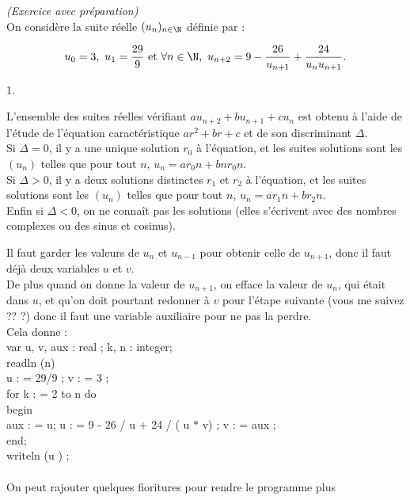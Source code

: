 \documentclass[11pt]{article}%
\begin{document}
 \begin{exercice}{\it (Exercice avec préparation)}~\\
 On considère la suite réelle $(u_{n})_{n \in \N}$ définie par : 
 
\[
 u_{0} = 3,\ u_{1} = \frac{29}{9} \text{ et } \forall n \in \N,\ u_{n +
2} = 9 - \frac{26}{u_{n + 1}} + \frac{24}{u_{n} u_{n + 1}}.
 
\]
 \begin{noliste}{1.}
 \setlength{\itemsep}{4mm}
 \item L'ensemble des suites réelles vérifiant $a u_{n + 2} + b u_{n +
1} + c u_{n}$ est obtenu à l'aide de l'étude de l'équation
caractéristique $a r^{2} + b r + c$ et de son discriminant $\Delta$. \\
 Si $\Delta = 0$, il y a une unique solution $r_{0}$ à l'équation, et
les suites solutions sont les $(u_{n})$ telles que pour tout $n$,
$u_{n} = a r_{0}{n} + b n r_{0}{n}$. \\
 Si $\Delta > 0$, il y a deux solutions distinctes $r_{1}$ et $r_{2}$ à
l'équation, et les suites solutions sont les $(u_{n})$ telles que pour
tout $n$, $u_{n} = a r_{1}{n} + b r_{2}{n}$. \\
 Enfin si $\Delta < 0$, on ne connaît pas les solutions (elles
s'écrivent avec des nombres complexes ou des sinus et cosinus). \\
 \item Il faut garder les valeurs de $u_{n}$ et $u_{n-1}$ pour obtenir
celle de $u_{n + 1}$, donc il faut déjà deux variables $u$ et $v$. \\
 De plus quand on donne la valeur de $u_{n + 1}$, on efface la valeur
de $u_{n}$, qui était dans $u$, et qu'on doit pourtant redonner à $v$
pour l'étape suivante (vous me suivez ?? ?) donc il faut une variable
auxiliaire pour ne pas la perdre. \\
 Cela donne : \\
 var u, v, aux : real ; k, n : integer; \\
 readln (n) \\
 u : = 29/9 ; v : = 3 ; \\
 for k : = 2 to n do \\
 begin \\
 aux : = u; u : = 9 - 26 / u + 24 / ( u $\ast$ v) ; v : = aux ; \\
 end; \\
 writeln (u ) ; \\
\\
 On peut rajouter quelques fioritures pour rendre le programme plus

\end{noliste}
\end{exercice}
\end{document}
